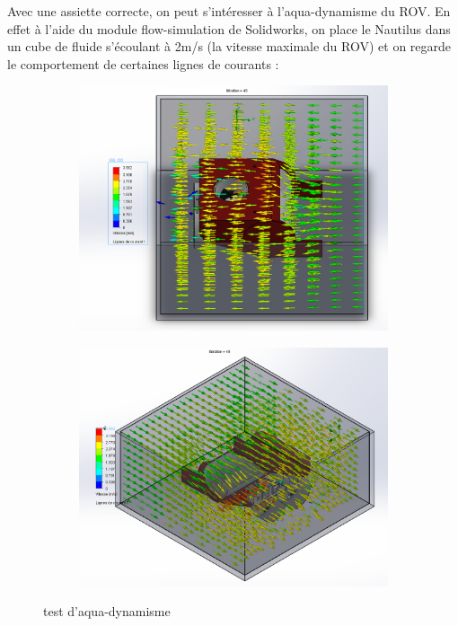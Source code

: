 \documentclass[a4paper,11pt]{report}
\begin{document}
				Avec une assiette correcte, on peut s'intéresser à l'aqua-dynamisme du ROV. En effet à l'aide du module flow-simulation de Solidworks, on place le Nautilus dans un cube de fluide s'écoulant à 2m/s (la vitesse maximale du ROV) et on regarde le comportement de certaines lignes de courants :
									
					\begin{figure}[!h]
					
						\centering
							\begin{subfigure}[b]{0.3\textwidth}
								\includegraphics[width=\textwidth]{Photos/Capture22.png}
							\end{subfigure}
							\begin{subfigure}[b]{0.3\textwidth}
								\includegraphics[width=\textwidth]{Photos/Capture23.png}
							\end{subfigure}
							\caption{test d'aqua-dynamisme}
							
					\end{figure}
					
\end{document}
